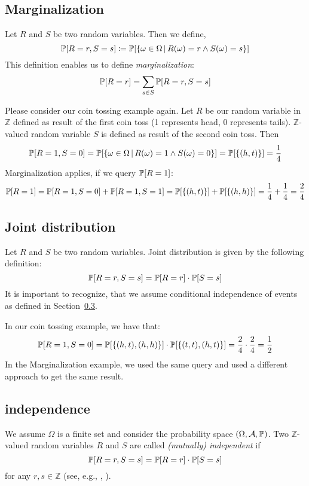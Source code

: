 \subsection{Marginalization}
\label{sec:bp-marginalization}
%
\begin{definition}
  Let $R$ and $S$ be two random variables. Then we define,
  \[
    \mathbb P[R=r, S=s] \coloneqq \mathbb P[\left\{\omega \in \Omega\,|\,R(\omega) = r \land S(\omega) = s\right\}]
  \]
  This definition enables us to define \emph{marginalization}:
  \[ \mathbb P[R=r] = \sum_{s \in S} \mathbb P[R=r, S=s] \]
\end{definition}
\begin{example}
  Please consider our coin tossing example again.
  Let $R$ be our random variable in $\mathbb Z$ defined as result of the first coin toss
  (1 represents head, 0 represents tails).
  $\mathbb Z$-valued random variable $S$ is defined as result of the second coin toss.
  Then
  \[
    \mathbb P[R=1, S=0] = \mathbb P[\left\{\omega \in \Omega\,|\,R(\omega) = 1 \land S(\omega) = 0\right\}]
                    = \mathbb P[\left\{(h, t)\right\}] = \frac14
  \]
  Marginalization applies, if we query $\mathbb P[R=1]$:
  \[
    \mathbb P[R=1] = \mathbb P[R=1, S=0] + \mathbb P[R=1, S=1] = \mathbb P[\left\{(h, t)\right\}] + \mathbb P[\left\{(h, h)\right\}] = \frac14 + \frac14 = \frac24
  \]
\end{example}

\subsection{Joint distribution}
\label{sec:bp-joint-distribution}
%
\begin{definition}
  Let $R$ and $S$ be two random variables.
  Joint distribution is given by the following definition:
  \[ \mathbb P[R=r, S=s] = \mathbb P[R=r] \cdot \mathbb P[S=s] \]
  It is important to recognize, that we assume conditional independence of events
  as defined in Section~\ref{sec:bp-indep}.
\end{definition}
\begin{example}
  In our coin tossing example, we have that:
  \[ \mathbb P[R=1, S=0] = \mathbb P[\left\{(h, t), (h, h)\right\}] \cdot \mathbb P[\left\{(t, t), (h, t)\right\}] = \frac24 \cdot \frac24 = \frac12 \]
  In the Marginalization example, we used the same query and used a different approach to get the same result.
\end{example}

\subsection{independence}
\label{sec:bp-indep}
%
\begin{definition}
  We assume $\Omega$ is a finite set and consider
  the probability space $(\Omega, \mathcal A, \mathbb P)$.
  Two $\mathbb Z$-valued random variables $R$ and $S$ are called \emph{(mutually) independent} if
  \[ \mathbb P[R=r, S=s] = \mathbb P[R=r] \cdot \mathbb P[S=s] \]
  for any $r, s \in {\mathbb Z}$ (see, e.g., \cite[p.~27]{ito}, \cite[p.~143]{grindstead}).
\end{definition}

